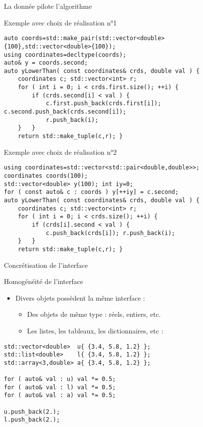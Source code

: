 \documentclass[handout,10pt]{beamer}
\begin{document}
\begin{frame}[fragile]{La donnée pilote l'algorithme}
\tiny
{}
\begin{block}{Exemple avec choix de réalisation n°1}
\begin{lstlisting}
auto coords=std::make_pair(std::vector<double>{100},std::vector<double>{100});
using coordinates=decltype(coords);
auto& y = coords.second;
auto yLowerThan( const coordinates& crds, double val ) {
    coordinates c; std::vector<int> r;
    for ( int i = 0; i < crds.first.size(); ++i) {
        if (crds.second[i] < val ) {
            c.first.push_back(crds.first[i]); c.second.push_back(crds.second[i]);
            r.push_back(i);
    }   }
    return std::make_tuple(c,r); }
\end{lstlisting}
\end{block}

\begin{exampleblock}{Exemple avec choix de réalisation n°2}
\begin{lstlisting}
using coordinates=std::vector<std::pair<double,double>>;
coordinates coords(100);
std::vector<double> y(100); int iy=0;
for ( const auto& c : coords ) y[++iy] = c.second;
auto yLowerThan( const coordinates& crds, double val ) {
    coordinates c; std::vector<int> r; 
    for ( int i = 0; i < crds.size(); ++i) {
        if (crds[i].second < val ) {
            c.push_back(crds[i]); r.push_back(i);
    }   }
    return std::make_tuple(c,r); }
\end{lstlisting}
\end{exampleblock}
\end{frame}

\begin{frame}[fragile]{Concrétisation de l'interface}
\tiny
\begin{block}{Homogénéité de l'interface}
\begin{itemize}
\item Divers objets possèdent la même interface :
\begin{itemize}
\item Des objets de même type : réels, entiers, etc.
\item Les listes, les tableaux, les dictionnaires, etc :
\end{itemize}
\end{itemize}
\begin{lstlisting}
std::vector<double>  u{ {3.4, 5.8, 1.2} };
std::list<double>    l{ {3.4, 5.8, 1.2} };
std::array<3,double> a{ {3.4, 5.8, 1.2} };

for ( auto& val : u) val *= 0.5;
for ( auto& val : l) val *= 0.5;
for ( auto& val : a) val *= 0.5;

u.push_back(2.);
l.push_back(2.);
\end{lstlisting}
\end{block}
\end{frame}
\end{document}
